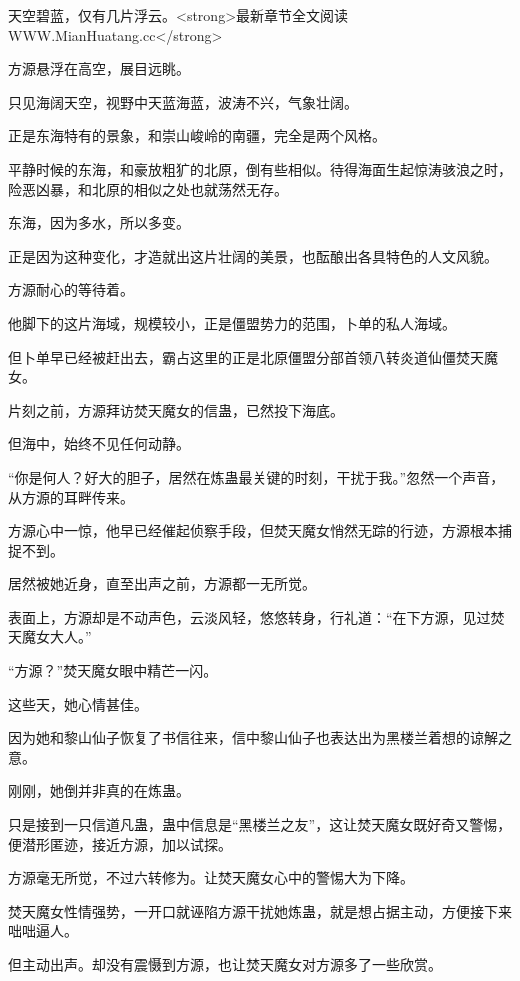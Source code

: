 
\begin{this_body}

天空碧蓝，仅有几片浮云。<strong>最新章节全文阅读WWW.MianHuatang.cc</strong>

方源悬浮在高空，展目远眺。

只见海阔天空，视野中天蓝海蓝，波涛不兴，气象壮阔。

正是东海特有的景象，和崇山峻岭的南疆，完全是两个风格。

平静时候的东海，和豪放粗犷的北原，倒有些相似。待得海面生起惊涛骇浪之时，险恶凶暴，和北原的相似之处也就荡然无存。

东海，因为多水，所以多变。

正是因为这种变化，才造就出这片壮阔的美景，也酝酿出各具特色的人文风貌。

方源耐心的等待着。

他脚下的这片海域，规模较小，正是僵盟势力的范围，卜单的私人海域。

但卜单早已经被赶出去，霸占这里的正是北原僵盟分部首领八转炎道仙僵焚天魔女。

片刻之前，方源拜访焚天魔女的信蛊，已然投下海底。

但海中，始终不见任何动静。

“你是何人？好大的胆子，居然在炼蛊最关键的时刻，干扰于我。”忽然一个声音，从方源的耳畔传来。

方源心中一惊，他早已经催起侦察手段，但焚天魔女悄然无踪的行迹，方源根本捕捉不到。

居然被她近身，直至出声之前，方源都一无所觉。

表面上，方源却是不动声色，云淡风轻，悠悠转身，行礼道：“在下方源，见过焚天魔女大人。”

“方源？”焚天魔女眼中精芒一闪。

这些天，她心情甚佳。

因为她和黎山仙子恢复了书信往来，信中黎山仙子也表达出为黑楼兰着想的谅解之意。

刚刚，她倒并非真的在炼蛊。

只是接到一只信道凡蛊，蛊中信息是“黑楼兰之友”，这让焚天魔女既好奇又警惕，便潜形匿迹，接近方源，加以试探。

方源毫无所觉，不过六转修为。让焚天魔女心中的警惕大为下降。

焚天魔女性情强势，一开口就诬陷方源干扰她炼蛊，就是想占据主动，方便接下来咄咄逼人。

但主动出声。却没有震慑到方源，也让焚天魔女对方源多了一些欣赏。


\end{this_body}
